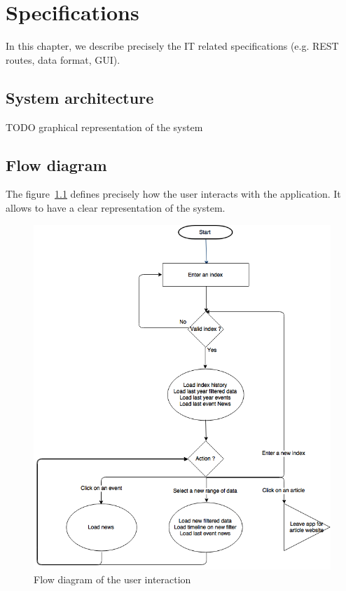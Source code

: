 \chapter{Specifications}
\label{chapter:specifications}
In this chapter, we describe precisely the IT related specifications (e.g. REST routes, data format, GUI).

\section{System architecture}
TODO graphical representation of the system

\section{Flow diagram}
The figure~\ref{fig:specs:flowdiagram} defines precisely how the user interacts with the application. It allows to have a clear representation of the system.

\begin{figure}[ht!]
    \centering
\includegraphics[scale=0.5]{Figures/workflow-stockstrooper.png}
\caption{Flow diagram of the user interaction}
\label{fig:specs:flowdiagram}
\end{figure}

